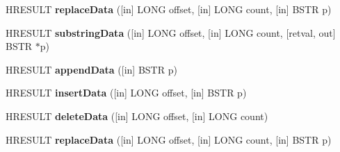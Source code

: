 \begin{DoxyCompactItemize}
\item 
\mbox{\label{interface_m_s_x_m_l2_1_1_i_x_m_l_d_o_m_character_data_a448f54e8e0951c31bdb157b3d0c267b5}} 
H\+R\+E\+S\+U\+LT {\bfseries replace\+Data} (\mbox{[}in\mbox{]} L\+O\+NG offset, \mbox{[}in\mbox{]} L\+O\+NG count, \mbox{[}in\mbox{]} B\+S\+TR p)
\item 
\mbox{\label{interface_m_s_x_m_l2_1_1_i_x_m_l_d_o_m_character_data_a74f8e5d73e36689dfc1e33f5459d0220}} 
H\+R\+E\+S\+U\+LT {\bfseries substring\+Data} (\mbox{[}in\mbox{]} L\+O\+NG offset, \mbox{[}in\mbox{]} L\+O\+NG count, \mbox{[}retval, out\mbox{]} B\+S\+TR $\ast$p)
\item 
\mbox{\label{interface_m_s_x_m_l2_1_1_i_x_m_l_d_o_m_character_data_af0c42e87b947f04f7d43529263c2a59f}} 
H\+R\+E\+S\+U\+LT {\bfseries append\+Data} (\mbox{[}in\mbox{]} B\+S\+TR p)
\item 
\mbox{\label{interface_m_s_x_m_l2_1_1_i_x_m_l_d_o_m_character_data_a5062b8f62739633567d3a8bc18777fc5}} 
H\+R\+E\+S\+U\+LT {\bfseries insert\+Data} (\mbox{[}in\mbox{]} L\+O\+NG offset, \mbox{[}in\mbox{]} B\+S\+TR p)
\item 
\mbox{\label{interface_m_s_x_m_l2_1_1_i_x_m_l_d_o_m_character_data_a4a125c94240e25ac8b3e01165ce791cc}} 
H\+R\+E\+S\+U\+LT {\bfseries delete\+Data} (\mbox{[}in\mbox{]} L\+O\+NG offset, \mbox{[}in\mbox{]} L\+O\+NG count)
\item 
\mbox{\label{interface_m_s_x_m_l2_1_1_i_x_m_l_d_o_m_character_data_a448f54e8e0951c31bdb157b3d0c267b5}} 
H\+R\+E\+S\+U\+LT {\bfseries replace\+Data} (\mbox{[}in\mbox{]} L\+O\+NG offset, \mbox{[}in\mbox{]} L\+O\+NG count, \mbox{[}in\mbox{]} B\+S\+TR p)
\end{DoxyCompactItemize}
